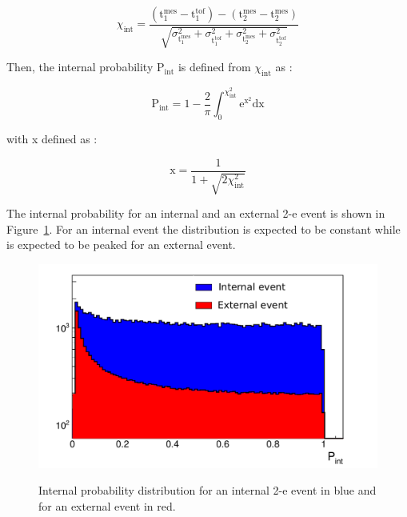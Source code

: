 \documentclass[main.tex]{subfiles}
\begin{document}
\begin{equation}
\chi_{\text{int}} = \frac{(\text{t}_\text{1}^{\text{mes}} - \text{t}_\text{1}^{\text{tof}}) - (\text{t}_\text{2}^{\text{mes}} - \text{t}_\text{2}^{\text{mes}} ) }{\sqrt{ \sigma^{\text{2}}_{\text{t}_\text{1}^{\text{mes}}} + \sigma^{\text{2}}_{\text{t}_\text{1}^{\text{tof}}} + \sigma^{\text{2}}_{\text{t}_\text{2}^{\text{mes}}} + \sigma^{\text{2}}_{\text{t}_\text{2}^{\text{tof}}}  }}
\end{equation}


\NI Then, the internal probability P$_{\text{int}}$ is defined from $\chi_{\text{int}}$ as : 


\begin{equation}\label{eq:probaDef}
\text{P}_{\text{int}} = \text{1} - \frac{\text{2}}{\pi} \int_\text{0}^{\chi^\text{2}_{\text{int}}} \text{e}^{\text{x}^\text{2}} \text{dx}
\end{equation}


\NI with x defined as :

\begin{equation}
\text{x} = \frac{\text{1}}{\text{1}+\sqrt{\text{2}\chi^\text{2}_{\text{int}}}}
\end{equation}


\NI The internal probability for an internal and an external 2-e event is shown in Figure~\ref{PintforIntandExt}. For an internal event the distribution is expected to be constant while is expected to be peaked for an external event.


\begin{figure}[h!]
\centering
\includegraphics[scale=0.55]{pictures/Chap6/Pint_explication.pdf}
\label{PintforIntandExt}
\caption{Internal probability distribution for an internal 2-e event in blue and for an external event in red.}
\end{figure}
\end{document}
